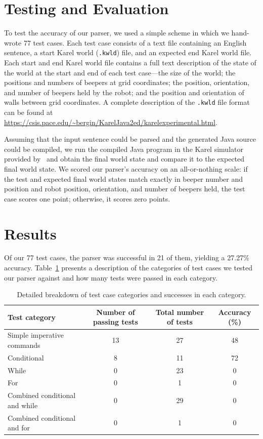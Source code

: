 \documentclass[11pt]{article}
\begin{document}
\section{Testing and Evaluation}
To test the accuracy of our parser, we used a simple scheme in which we hand-wrote 77 test cases.
Each test case consists of a text file containing an English sentence, a start Karel world
(\texttt{.kwld}) file, and an expected end Karel world file. Each start and end Karel world file
contains a full text description of the state of the world at the start and end of each test
case---the size of the world; the positions and numbers of beepers at grid coordinates; the
position, orientation, and number of beepers held by the robot; and the position and orientation of
walls between grid coordinates. A complete description of the \texttt{.kwld} file format can be
found at \url{https://csis.pace.edu/~bergin/KarelJava2ed/karelexperimental.html}.

Assuming that the input sentence could be parsed and the generated Java source could be compiled,
we run the compiled Java program in the Karel simulator provided by~ and
obtain the final world state and compare it to the expected final world state. We scored our
parser's accuracy on an all-or-nothing scale: if the test and expected final world states match
exactly in beeper number and position and robot position, orientation, and number of beepers held,
the test case scores one point; otherwise, it scores zero points.

\section{Results}
Of our 77 test cases, the parser was successful in 21 of them, yielding a 27.27\% accuracy.
Table~\ref{tab:results-breakdown} presents a description of the categories of test cases we tested
our parser against and how many tests were passed in each category.

\begin{table}[ht]
\centering
    \begin{tabular}{lccc}
    \toprule
    Test category & \multicolumn{1}{p{2cm}}{\centering Number of passing tests} & \multicolumn{1}{p{3cm}}{\centering Total number of tests} & \multicolumn{1}{p{2cm}}{\centering Accuracy (\%)}\\ \midrule
    Simple imperative commands & 13 & 27 & 48 \\
    Conditional & 8 & 11 & 72 \\
    While & 0 & 23 & 0 \\
    For & 0 & 1 & 0 \\
    Combined conditional and while & 0 & 29 & 0 \\
    Combined conditional and for & 0 & 1 & 0 \\
    \bottomrule
    \end{tabular}
\caption{Detailed breakdown of test case categories and successes in each category.}
\label{tab:results-breakdown}
\end{table}
\end{document}
